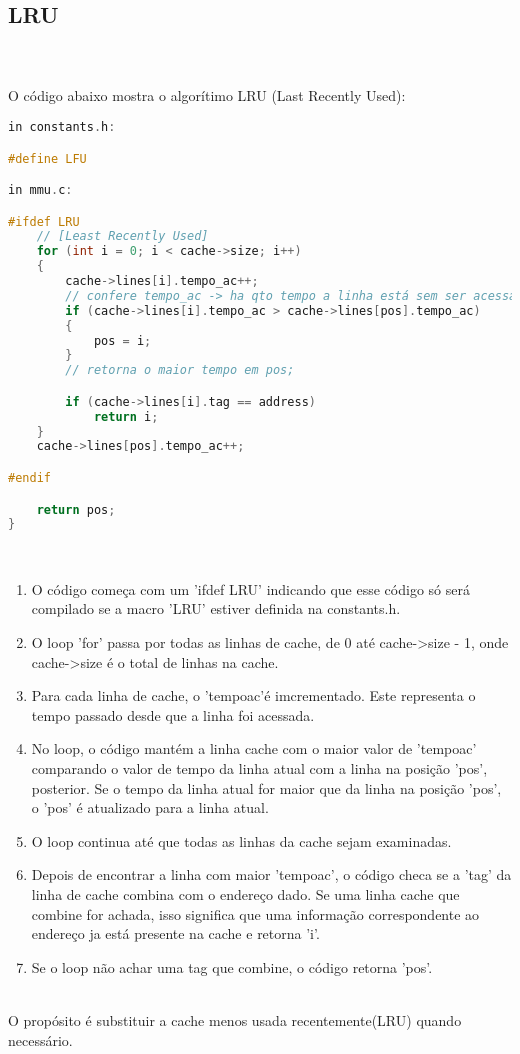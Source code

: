 \documentclass{article}
\begin{document}
\subsection{LRU} 
\\ \\ 
O código abaixo mostra o algorítimo LRU (Last Recently Used):
\begin{lstlisting}[caption={Exemplo de código do algorítimo LRU.},label={lst:cod1},language=C]
in constants.h:

#define LFU

in mmu.c:

#ifdef LRU
    // [Least Recently Used]
    for (int i = 0; i < cache->size; i++)
    {
        cache->lines[i].tempo_ac++;
        // confere tempo_ac -> ha qto tempo a linha está sem ser acessada;
        if (cache->lines[i].tempo_ac > cache->lines[pos].tempo_ac)
        {
            pos = i;
        }
        // retorna o maior tempo em pos;

        if (cache->lines[i].tag == address)
            return i;
    }
    cache->lines[pos].tempo_ac++;

#endif

    return pos;
}

\end{lstlisting}
\\
\begin{enumerate}
    \item O código começa com um 'ifdef LRU' indicando que esse código só será compilado se a macro 'LRU' estiver definida na constants.h.
    \item O loop 'for' passa por todas as linhas de cache, de 0 até cache->size - 1, onde cache->size é o total de linhas na cache.
    \item Para cada linha de cache, o 'tempoac'é imcrementado. Este representa o tempo passado desde que a linha foi acessada.
    \item No loop, o código mantém a linha cache com o maior valor de 'tempoac' comparando o valor de tempo da linha atual com a linha na posição 'pos', posterior. Se o tempo da linha atual for maior que da linha na posição 'pos', o 'pos' é atualizado para a linha atual.
    \item O loop continua até que todas as linhas da cache sejam examinadas.
    \item Depois de encontrar a linha com maior 'tempoac', o código checa se a 'tag' da linha de cache combina com o endereço dado. Se uma linha cache que combine for achada, isso significa que uma informação correspondente ao endereço ja está presente na cache e retorna 'i'.
    \item Se o loop não achar uma tag que combine, o código retorna 'pos'.
\end{enumerate}
\\ O propósito é substituir a cache menos usada recentemente(LRU) quando necessário.
\clearpage
\end{document}
